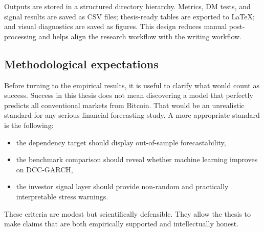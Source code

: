 Outputs are stored in a structured directory hierarchy. Metrics, DM tests, and signal results are saved as CSV files; thesis-ready tables are exported to LaTeX; and visual diagnostics are saved as figures. This design reduces manual post-processing and helps align the research workflow with the writing workflow.

\subsection{Methodological expectations}

Before turning to the empirical results, it is useful to clarify what would count as success. Success in this thesis does not mean discovering a model that perfectly predicts all conventional markets from Bitcoin. That would be an unrealistic standard for any serious financial forecasting study. A more appropriate standard is the following:

\begin{itemize}
    \item the dependency target should display out-of-sample forecastability,
    \item the benchmark comparison should reveal whether machine learning improves on DCC-GARCH,
    \item the investor signal layer should provide non-random and practically interpretable stress warnings.
\end{itemize}

These criteria are modest but scientifically defensible. They allow the thesis to make claims that are both empirically supported and intellectually honest.
